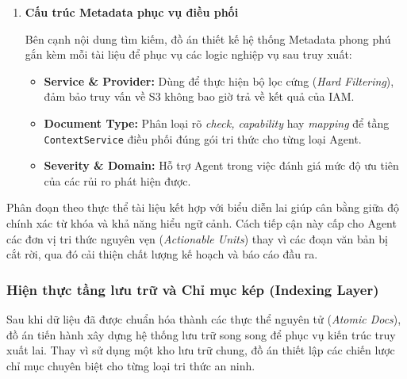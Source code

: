 \begin{enumerate}
    \item \textbf{Cấu trúc Metadata phục vụ điều phối}

    Bên cạnh nội dung tìm kiếm, đồ án thiết kế hệ thống Metadata phong phú gắn kèm mỗi tài liệu để phục vụ các logic nghiệp vụ sau truy xuất:
    \begin{itemize}
        \item \textbf{Service \& Provider:} Dùng để thực hiện bộ lọc cứng (\textit{Hard Filtering}), đảm bảo truy vấn về S3 không bao giờ trả về kết quả của IAM.
        \item \textbf{Document Type:} Phân loại rõ \textit{check, capability} hay \textit{mapping} để tầng \texttt{ContextService} điều phối đúng gói tri thức cho từng loại Agent.
        \item \textbf{Severity \& Domain:} Hỗ trợ Agent trong việc đánh giá mức độ ưu tiên của các rủi ro phát hiện được.
    \end{itemize}
\end{enumerate}



Phân đoạn theo thực thể tài liệu kết hợp với biểu diễn lai giúp cân bằng giữa độ chính xác từ khóa và khả năng hiểu ngữ cảnh. Cách tiếp cận này cấp cho Agent các đơn vị tri thức nguyên vẹn (\textit{Actionable Units}) thay vì các đoạn văn bản bị cắt rời, qua đó cải thiện chất lượng kế hoạch và báo cáo đầu ra.

\subsubsection*{Hiện thực tầng lưu trữ và Chỉ mục kép (Indexing Layer)}

Sau khi dữ liệu đã được chuẩn hóa thành các thực thể nguyên tử (\textit{Atomic Docs}), đồ án tiến hành xây dựng hệ thống lưu trữ song song để phục vụ kiến trúc truy xuất lai. Thay vì sử dụng một kho lưu trữ chung, đồ án thiết lập các chiến lược chỉ mục chuyên biệt cho từng loại tri thức an ninh.

